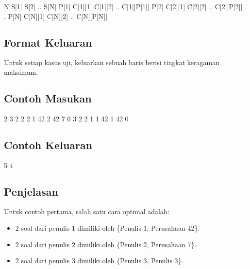 \documentclass[../main_problemset.tex]{subfiles} %
\begin{document}
\begin{lcverbatim}
N
S[1] S[2] .. S[N]
P[1] C[1][1] C[1][2] .. C[1][P[1]]
P[2] C[2][1] C[2][2] .. C[2][P[2]]
.
.
P[N] C[N][1] C[N][2] .. C[N][P[N]]
\end{lcverbatim}

\subsection*{Format Keluaran}

Untuk setiap kasus uji, keluarkan sebuah baris berisi tingkat keragaman maksimum.



\vspace{.4cm}

\begin{minipage}[t]{0.5\textwidth}
\subsection*{Contoh Masukan}

\begin{lcverbatim}
2
3
2 2 2
1 42
2 42 7
0
3
2 2 1
1 42
1 42
0
\end{lcverbatim}
\end{minipage}
\begin{minipage}[t]{0.5\textwidth}
\subsection*{Contoh Keluaran}

\begin{lcverbatim}
5
4
\end{lcverbatim}
\end{minipage}

\pagebreak
\subsection*{Penjelasan}

Untuk contoh pertama, salah satu cara optimal adalah:

\begin{itemize}
	\item 2 soal dari penulis 1 dimiliki oleh \{Penulis 1, Perusahaan 42\}.
	\item 2 soal dari penulis 2 dimiliki oleh \{Penulis 2, Perusahaan 7\}.
	\item 2 soal dari penulis 3 dimiliki oleh \{Penulis 3, Penulis 3\}.
\end{itemize}
\end{document}
